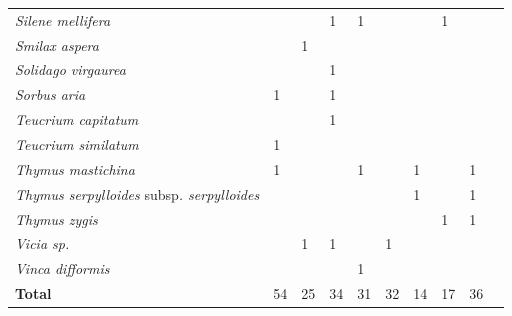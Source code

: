{\begin{longtable}{llllllllll}
\textit{Silene mellifera}  &  &  & 1 & 1 &  &  & 1 &  \\
\textit{Smilax aspera}  &  & 1 &  &  &  &  &  &  \\
\textit{Solidago virgaurea}  &  &  & 1 &  &  &  &  &  \\
\textit{Sorbus aria}  & 1 &  & 1 &  &  &  &  &  \\
\textit{Teucrium capitatum}  &  &  & 1 &  &  &  &  &  \\
\textit{Teucrium similatum}  & 1 &  &  &  &  &  &  &  \\
\textit{Thymus mastichina}  & 1 &  &  & 1 &  & 1 &  & 1 \\
\textit{Thymus serpylloides }subsp\textit{. serpylloides}  &  &  &  &  &  & 1 &  & 1 \\
\textit{Thymus zygis}  &  &  &  &  &  &  & 1 & 1 \\
\textit{Vicia sp.}  &  & 1 & 1 &  & 1 &  &  &  \\
\textit{Vinca difformis}  &  &  &  & 1 &  &  &  &  \\ 
\hline
\textbf{Total}  & 54 & 25 & 34 & 31 & 32 & 14 & 17 & 36 \\
\bottomrule
\end{longtable}


}%
